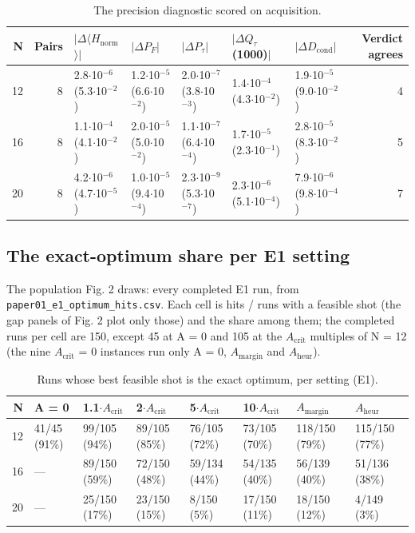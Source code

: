 \documentclass[journal]{IEEEtran}
\begin{document}
\begin{table}[!t]
\centering
\scriptsize
\caption{The precision diagnostic scored on acquisition.}
\label{tab:S36}
\begin{tabular}{rrlllllr}
\toprule
N & Pairs & $|$$\Delta$$\langle$$H_{\mathrm{norm}}$$\rangle$$|$ & $|$$\Delta$$P_{F}$$|$ & $|$$\Delta$$P_{\tau}$$|$ & $|$$\Delta$$Q_{\tau}$(1000)$|$ & $|$$\Delta$$D_{\mathrm{cond}}$$|$ & Verdict agrees \\
\midrule
12 & 8 & 2.8$\cdot$10$^{-6}$ (5.3$\cdot$10$^{-2}$) & 1.2$\cdot$10$^{-5}$ (6.6$\cdot$10$^{-2}$) & 2.0$\cdot$10$^{-7}$ (3.8$\cdot$10$^{-3}$) & 1.4$\cdot$10$^{-4}$ (4.3$\cdot$10$^{-2}$) & 1.9$\cdot$10$^{-5}$ (9.0$\cdot$10$^{-2}$) & 4 \\
16 & 8 & 1.1$\cdot$10$^{-4}$ (4.1$\cdot$10$^{-2}$) & 2.0$\cdot$10$^{-5}$ (5.0$\cdot$10$^{-2}$) & 1.1$\cdot$10$^{-7}$ (6.4$\cdot$10$^{-4}$) & 1.7$\cdot$10$^{-5}$ (2.3$\cdot$10$^{-1}$) & 2.8$\cdot$10$^{-5}$ (8.3$\cdot$10$^{-2}$) & 5 \\
20 & 8 & 4.2$\cdot$10$^{-6}$ (4.7$\cdot$10$^{-5}$) & 1.0$\cdot$10$^{-5}$ (9.4$\cdot$10$^{-4}$) & 2.3$\cdot$10$^{-9}$ (5.3$\cdot$10$^{-7}$) & 2.3$\cdot$10$^{-6}$ (5.1$\cdot$10$^{-4}$) & 7.9$\cdot$10$^{-6}$ (9.8$\cdot$10$^{-4}$) & 7 \\
\bottomrule
\end{tabular}
\end{table}


\subsection{The exact-optimum share per E1 setting}


The population Fig. 2 draws: every completed E1 run, from \texttt{paper01\_e1\_optimum\_hits.csv}. Each cell is hits / runs with a feasible shot (the gap panels of Fig. 2 plot only those) and the share among them; the completed runs per cell are 150, except 45 at A = 0 and 105 at the $A_{\mathrm{crit}}$ multiples of N = 12 (the nine $A_{\mathrm{crit}}$ = 0 instances run only A = 0, $A_{\mathrm{margin}}$ and $A_{\mathrm{heur}}$).


\begin{table}[!t]
\centering
\scriptsize
\caption{Runs whose best feasible shot is the exact optimum, per setting (E1).}
\label{tab:S37}
\begin{tabular}{rlllllll}
\toprule
N & A = 0 & 1.1$\cdot$$A_{\mathrm{crit}}$ & 2$\cdot$$A_{\mathrm{crit}}$ & 5$\cdot$$A_{\mathrm{crit}}$ & 10$\cdot$$A_{\mathrm{crit}}$ & $A_{\mathrm{margin}}$ & $A_{\mathrm{heur}}$ \\
\midrule
12 & 41/45 (91\%) & 99/105 (94\%) & 89/105 (85\%) & 76/105 (72\%) & 73/105 (70\%) & 118/150 (79\%) & 115/150 (77\%) \\
16 & --- & 89/150 (59\%) & 72/150 (48\%) & 59/134 (44\%) & 54/135 (40\%) & 56/139 (40\%) & 51/136 (38\%) \\
20 & --- & 25/150 (17\%) & 23/150 (15\%) & 8/150 (5\%) & 17/150 (11\%) & 18/150 (12\%) & 4/149 (3\%) \\
\bottomrule
\end{tabular}
\end{table}
\end{document}
